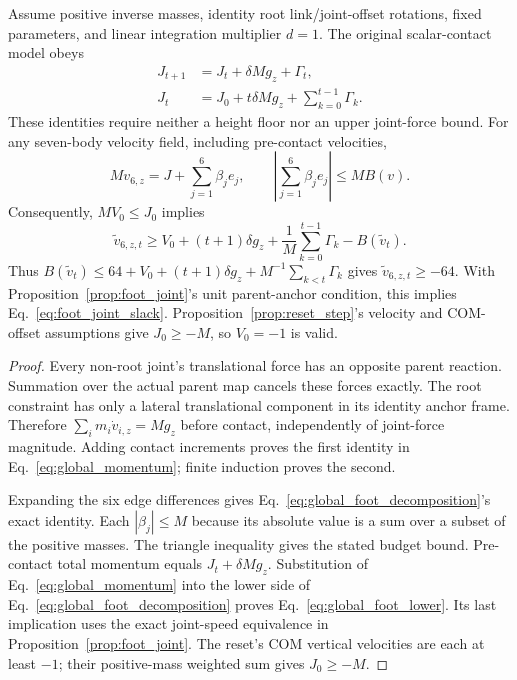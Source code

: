 \begin{proposition}
\label{prop:global_momentum}
Assume positive inverse masses, identity root link/joint-offset rotations, fixed parameters, and linear integration multiplier $d=1$.
The original scalar-contact model obeys
\begin{align}
 J_{t+1}&=J_t+\delta M g_z+\Gamma_t,\nonumber\\
 J_t&=J_0+t\delta M g_z+\sum_{k=0}^{t-1}\Gamma_k.
 \label{eq:global_momentum}
\end{align}
These identities require neither a height floor nor an upper joint-force bound.
For any seven-body velocity field, including pre-contact velocities,
\begin{equation}
 M v_{6,z}=J+\sum_{j=1}^6\beta_j e_j,
 \qquad \left|\sum_{j=1}^6\beta_j e_j\right|\le M B(v).
 \label{eq:global_foot_decomposition}
\end{equation}
Consequently, $M V_0\le J_0$ implies
\begin{equation}
 \widetilde v_{6,z,t}\ge V_0+(t+1)\delta g_z+
   \frac1M\sum_{k=0}^{t-1}\Gamma_k-B(\widetilde v_t).
 \label{eq:global_foot_lower}
\end{equation}
Thus $B(\widetilde v_t)\le64+V_0+(t+1)\delta g_z+M^{-1}\sum_{k<t}\Gamma_k$ gives $\widetilde v_{6,z,t}\ge-64$.
With Proposition~\ref{prop:foot_joint}'s unit parent-anchor condition, this implies Eq.~\eqref{eq:foot_joint_slack}.
Proposition~\ref{prop:reset_step}'s velocity and COM-offset assumptions give $J_0\ge-M$, so $V_0=-1$ is valid.
\end{proposition}

\begin{proof}
Every non-root joint's translational force has an opposite parent reaction.
Summation over the actual parent map cancels these forces exactly.
The root constraint has only a lateral translational component in its identity anchor frame.
Therefore $\sum_i m_i\dot v_{i,z}=M g_z$ before contact, independently of joint-force magnitude.
Adding contact increments proves the first identity in Eq.~\eqref{eq:global_momentum}; finite induction proves the second.

Expanding the six edge differences gives Eq.~\eqref{eq:global_foot_decomposition}'s exact identity.
Each $|\beta_j|\le M$ because its absolute value is a sum over a subset of the positive masses.
The triangle inequality gives the stated budget bound.
Pre-contact total momentum equals $J_t+\delta M g_z$.
Substitution of Eq.~\eqref{eq:global_momentum} into the lower side of Eq.~\eqref{eq:global_foot_decomposition} proves Eq.~\eqref{eq:global_foot_lower}.
Its last implication uses the exact joint-speed equivalence in Proposition~\ref{prop:foot_joint}.
The reset's COM vertical velocities are each at least $-1$; their positive-mass weighted sum gives $J_0\ge-M$.
\end{proof}

